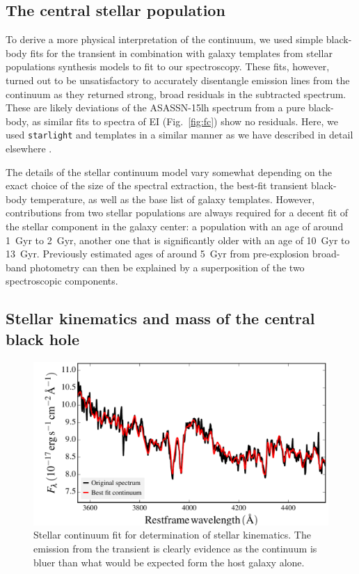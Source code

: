 \documentclass[traditabstract]{aa}
\begin{document}
\subsection{The central stellar population}
\label{sec:spop}

To derive a more physical interpretation of the continuum, we used simple black-body fits for the transient in combination with galaxy templates from stellar populations synthesis models to fit to our spectroscopy. These fits, however, turned out to be unsatisfactory to accurately disentangle emission lines from the continuum as they returned strong, broad residuals in the subtracted spectrum. These are likely deviations of the ASASSN-15lh spectrum from a pure black-body, as similar fits to spectra of EI (Fig.~\ref{fig:fc}) show no residuals. Here, we used \texttt{starlight} \citep{2005MNRAS.358..363C, 2009RMxAC..35..127C} and \citet{2003MNRAS.344.1000B} templates in a similar manner as we have described in detail elsewhere \citep{2016MNRAS.455.4087G, 2017arXiv170205430K}.

The details of the stellar continuum model vary somewhat depending on the exact choice of the size of the spectral extraction, the best-fit transient black-body temperature, as well as the base list of galaxy templates. However, contributions from two stellar populations are always required for a decent fit of the stellar component in the galaxy center: a population with an age of around 1~Gyr to 2~Gyr, another one that is significantly older with an age of 10~Gyr to 13~Gyr. Previously estimated ages of around 5~Gyr from pre-explosion broad-band photometry \citep{2015ATel.7843....1M, 2016NatAs...1E...2L,  2016Sci...351..257D} can then be explained by a superposition of the two spectroscopic components. 

\subsection{Stellar kinematics and mass of the central black hole}

\begin{figure}
  \includegraphics[width=0.999\linewidth]{fig/XS_stargas.pdf}
\caption{Stellar continuum fit for determination of stellar kinematics. The emission from the transient is clearly evidence as the continuum is bluer than what would be expected form the host galaxy alone.}
\label{fig:stargas_sig}
\end{figure}
\end{document}
